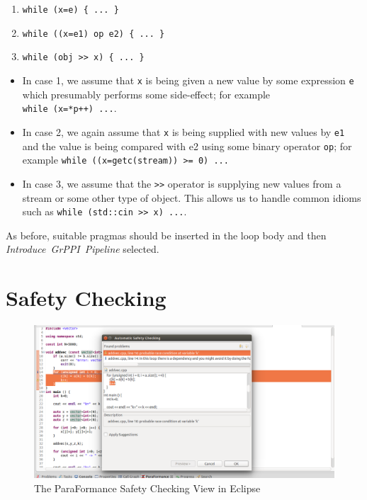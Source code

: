 \begin{enumerate}
\def\labelenumi{\arabic{enumi}.}
\item
  \texttt{while\ (x=e)\ \{\ ...\ \}}
\item
  \texttt{while\ ((x=e1)\ op\ e2)\ \{\ ...\ \}}
\item
  \texttt{while\ (obj\ \textgreater{}\textgreater{}\ x)\ \{\ ...\ \}}
\end{enumerate}

\begin{itemize}
\item In case 1, we assume that \texttt{x} is being given a new value by some
expression \texttt{e} which presumably performs some side-effect; for
example \texttt{while\ (x=*p++)\ ...}.

\item In case 2, we again assume that \texttt{x} is being supplied with new
values by \texttt{e1} and the value is being compared with e2 using some
binary operator \texttt{op}; for example
\texttt{while\ ((x=getc(stream))\ \textgreater{}=\ 0)\ ...}

\item In case 3, we assume that the \texttt{\textgreater{}\textgreater{}}
operator is supplying new values from a stream or some other type of
object. This allows us to handle common idioms such as
\texttt{while\ (std::cin\ \textgreater{}\textgreater{}\ x)\ ...}.
\end{itemize}

As before, suitable pragmas should be inserted in the loop body and then
\textit{Introduce\ GrPPI\ Pipeline} selected.
%

\section{Safety Checking}
\begin{figure}
\centering
\includegraphics[scale=0.26]{figures/pf-safety-auto-dialog.png}
\caption{The ParaFormance Safety Checking View in Eclipse}
\label{fig:safety1}
\end{figure}

